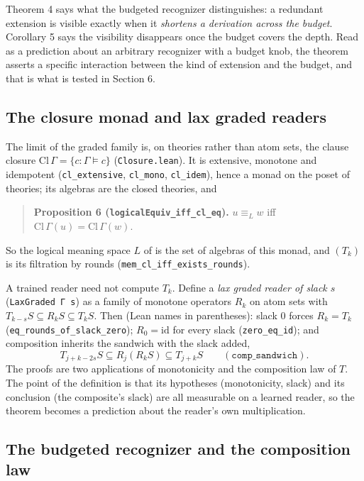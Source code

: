 Theorem 4 says what the budgeted recognizer distinguishes: a redundant extension is visible exactly when it \emph{shortens a derivation across the budget}. Corollary 5 says the visibility disappears once the budget covers the depth. Read as a prediction about an arbitrary recognizer with a budget knob, the theorem asserts a specific interaction between the kind of extension and the budget, and that is what is tested in Section 6.

\subsection{The closure monad and lax graded readers}\label{the-closure-monad-and-lax-graded-readers}

The limit of the graded family is, on theories rather than atom sets, the clause closure \(\mathrm{Cl}\,\Gamma=\{c:\Gamma\models c\}\) (\texttt{Closure.lean}). It is extensive, monotone and idempotent (\texttt{cl\_extensive}, \texttt{cl\_mono}, \texttt{cl\_idem}), hence a monad on the poset of theories; its algebras are the closed theories, and

\begin{quote}
\textbf{Proposition 6 (\texttt{logicalEquiv\_iff\_cl\_eq}).} \(u\equiv_Lw\) iff \(\mathrm{Cl}\,\Gamma(u)=\mathrm{Cl}\,\Gamma(w)\).
\end{quote}

So the logical meaning space \(L\) of \cite{rp2026} is the set of algebras of this monad, and \((T_k)\) is its filtration by rounds (\texttt{mem\_cl\_iff\_exists\_rounds}).

A trained reader need not compute \(T_k\). Define a \emph{lax graded reader of slack \(s\)} (\texttt{LaxGraded\ Γ\ s}) as a family of monotone operators \(R_k\) on atom sets with \(T_{k-s}S\subseteq R_kS\subseteq T_kS\). Then (Lean names in parentheses): slack \(0\) forces \(R_k=T_k\) (\texttt{eq\_rounds\_of\_slack\_zero}); \(R_0=\mathrm{id}\) for every slack (\texttt{zero\_eq\_id}); and composition inherits the sandwich with the slack added, \[T_{j+k-2s}S\subseteq R_j(R_kS)\subseteq T_{j+k}S\qquad(\texttt{comp\_sandwich}).\] The proofs are two applications of monotonicity and the composition law of \(T\). The point of the definition is that its hypotheses (monotonicity, slack) and its conclusion (the composite's slack) are all measurable on a learned reader, so the theorem becomes a prediction about the reader's own multiplication.

\subsection{The budgeted recognizer and the composition law}\label{the-budgeted-recognizer-and-the-composition-law}

